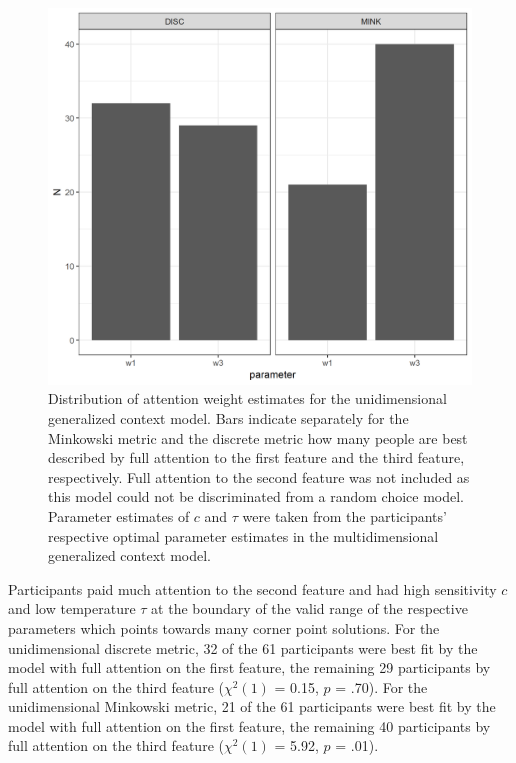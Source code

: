 \documentclass[a4paper,man,natbib]{apa6}
\begin{document}
\begin{figure}
\centering
\includegraphics[width = \textwidth]{fig_par_unidim.png}
\caption{Distribution of attention weight estimates for the unidimensional generalized context model. Bars indicate separately for the Minkowski metric and the discrete metric how many people are best described by full attention to the first feature and the third feature, respectively. Full attention to the second feature was not included as this model could not be discriminated from a random choice model. Parameter estimates of $c$ and $\tau$ were taken from the participants' respective optimal parameter estimates in the multidimensional generalized context model.}
\label{fig:par_unidim}
\end{figure}

Participants paid much attention to the second feature and had high sensitivity $c$ and low temperature $\tau$ at the boundary of the valid range of the respective parameters which points towards many corner point solutions. For the unidimensional discrete metric, 32 of the 61 participants were best fit by the model with full attention on the first feature, the remaining 29 participants by full attention on the third feature ($\chi^{2}(1)$ = 0.15, $p$ = .70). For the unidimensional Minkowski metric, 21 of the 61 participants were best fit by the model with full attention on the first feature, the remaining 40 participants by full attention on the third feature ($\chi^{2}(1)$ = 5.92, $p$ = .01).
\end{document}

